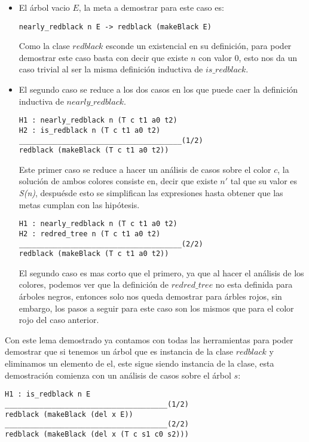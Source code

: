 \begin{itemize}
  \item El \'arbol vacio $E$, la meta a demostrar para este caso es:
\begin{verbatim}
nearly_redblack n E -> redblack (makeBlack E)
\end{verbatim}
        Como la clase $redblack$ esconde un existencial en su definici\'on, para poder demostrar
        este caso basta con decir que existe $n$ con valor 0, esto nos da un caso trivial al ser la
        misma definici\'on inductiva de $is\_redblack$.
  \item El segundo caso se reduce a los dos casos en los que puede caer la definici\'on inductiva
  de $nearly\_redblack$.
\begin{verbatim}
H1 : nearly_redblack n (T c t1 a0 t2)
H2 : is_redblack n (T c t1 a0 t2)
______________________________________(1/2)
redblack (makeBlack (T c t1 a0 t2))
\end{verbatim}
        Este primer caso se reduce a hacer un análisis de casos sobre el color $c$, la soluci\'on
        de ambos colores consiste en, decir que existe $n'$ tal que su valor es \textit{S(n)},
        despuésde esto se simplifican las expresiones hasta obtener que las metas cumplan con las
        hip\'otesis.
\begin{verbatim}
H1 : nearly_redblack n (T c t1 a0 t2)
H2 : redred_tree n (T c t1 a0 t2)
______________________________________(2/2)
redblack (makeBlack (T c t1 a0 t2))
\end{verbatim}
        El segundo caso es mas corto que el primero, ya que al hacer el análisis de los colores,
        podemos ver que la definición de $redred\_tree$ no esta definida para \'arboles negros,
        entonces solo nos queda demostrar para \'arbles rojos, sin embargo, los pasos a seguir para
        este caso son los mismos que para el color rojo del caso anterior.
\end{itemize}

Con este lema demostrado ya contamos con todas las herramientas para poder demostrar que si tenemos
un \'arbol que es instancia de la clase $redblack$ y eliminamos un elemento de el, este sigue
siendo instancia de la clase, esta demostraci\'on comienza con un análisis de casos sobre el
\'arbol $s$:

\begin{verbatim}
H1 : is_redblack n E
______________________________________(1/2)
redblack (makeBlack (del x E))
______________________________________(2/2)
redblack (makeBlack (del x (T c s1 c0 s2)))
\end{verbatim}

